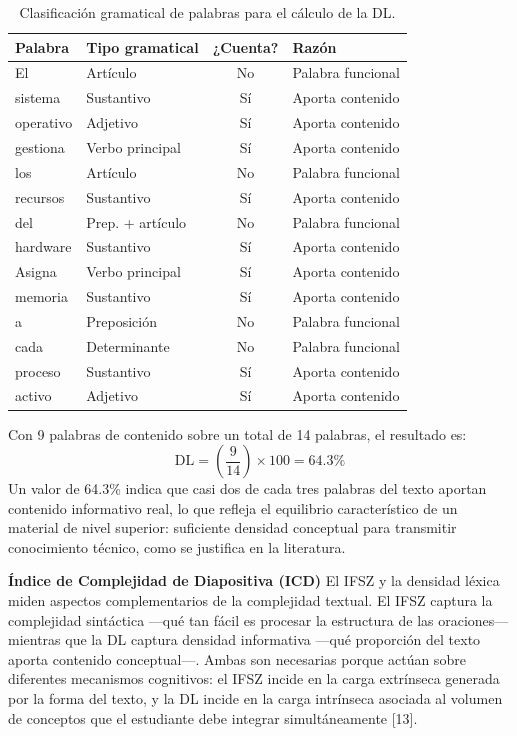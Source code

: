 \documentclass[11pt]{article}
\begin{document}
\begin{table}[H]
    \centering
    \begin{tabular}{|p{2.1cm}|p{4.1cm}|c|p{3.7cm}|}
        \hline
        \textbf{Palabra} & \textbf{Tipo gramatical} & \textbf{¿Cuenta?} & \textbf{Razón} \\
        \hline
        El & Artículo & No & Palabra funcional \\
        \hline
        sistema & Sustantivo & Sí & Aporta contenido \\
        \hline
        operativo & Adjetivo & Sí & Aporta contenido \\
        \hline
        gestiona & Verbo principal & Sí & Aporta contenido \\
        \hline
        los & Artículo & No & Palabra funcional \\
        \hline
        recursos & Sustantivo & Sí & Aporta contenido \\
        \hline
        del & Prep. + artículo & No & Palabra funcional \\
        \hline
        hardware & Sustantivo & Sí & Aporta contenido \\
        \hline
        Asigna & Verbo principal & Sí & Aporta contenido \\
        \hline
        memoria & Sustantivo & Sí & Aporta contenido \\
        \hline
        a & Preposición & No & Palabra funcional \\
        \hline
        cada & Determinante & No & Palabra funcional \\
        \hline
        proceso & Sustantivo & Sí & Aporta contenido \\
        \hline
        activo & Adjetivo & Sí & Aporta contenido \\
        \hline
    \end{tabular}
    \caption{Clasificación gramatical de palabras para el cálculo de la DL.}
\end{table}

Con 9 palabras de contenido sobre un total de 14 palabras, el resultado es:
\[
\mathrm{DL} = \left( \frac{9}{14} \right) \times 100 = 64.3\%
\]
Un valor de 64.3\% indica que casi dos de cada tres palabras del texto aportan contenido informativo real, lo que refleja el equilibrio característico de un material de nivel superior: suficiente densidad conceptual para transmitir conocimiento técnico, como se justifica en la literatura.

\textbf{Índice de Complejidad de Diapositiva (ICD)}
El IFSZ y la densidad léxica miden aspectos complementarios de la complejidad textual. El IFSZ captura la complejidad sintáctica —qué tan fácil es procesar la estructura de las oraciones— mientras que la DL captura densidad informativa —qué proporción del texto aporta contenido conceptual—. Ambas son necesarias porque actúan sobre diferentes mecanismos cognitivos: el IFSZ incide en la carga extrínseca generada por la forma del texto, y la DL incide en la carga intrínseca asociada al volumen de conceptos que el estudiante debe integrar simultáneamente [13].
\end{document}
